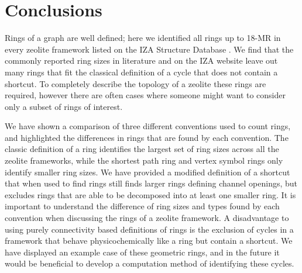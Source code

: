 \documentclass[preprint,numrefs,noinfo,sort&compress]{elsarticle}
\providecommand{\DIFaddbegin}{} %
\providecommand{\DIFaddend}{} %
\providecommand{\DIFdelbegin}{} %
\providecommand{\DIFdelend}{} %
\newcommand{\DIFscaledelfig}{0.5}
\newlength{\DIFdelgraphicswidth} %
\newlength{\DIFdelgraphicsheight} %
\newcommand{\DIFaddincludegraphics}[2][]{{\color{blue}\fbox{\DIFOincludegraphics[#1]{#2}}}} %
\newcommand{\DIFdelincludegraphics}[2][]{%
\sbox{\DIFdelgraphicsbox}{\DIFOincludegraphics[#1]{#2}}%
\settoboxwidth{\DIFdelgraphicswidth}{\DIFdelgraphicsbox} %
\settoboxtotalheight{\DIFdelgraphicsheight}{\DIFdelgraphicsbox} %
\scalebox{\DIFscaledelfig}{%
\parbox[b]{\DIFdelgraphicswidth}{\usebox{\DIFdelgraphicsbox}\\[-\baselineskip] \rule{\DIFdelgraphicswidth}{0em}}\llap{\resizebox{\DIFdelgraphicswidth}{\DIFdelgraphicsheight}{%
\setlength{\unitlength}{\DIFdelgraphicswidth}%
\begin{picture}(1,1)%
\thicklines\linethickness{2pt} %
{\color[rgb]{1,0,0}\put(0,0){\framebox(1,1){}}}%
{\color[rgb]{1,0,0}\put(0,0){\line( 1,1){1}}}%
{\color[rgb]{1,0,0}\put(0,1){\line(1,-1){1}}}%
\end{picture}%
}\hspace*{3pt}}} %
} %
\DeclareRobustCommand{\DIFaddbegin}{\DIFOaddbegin \let\includegraphics\DIFaddincludegraphics} %
\DeclareRobustCommand{\DIFaddend}{\DIFOaddend \let\includegraphics\DIFOincludegraphics} %
\DeclareRobustCommand{\DIFdelbegin}{\DIFOdelbegin \let\includegraphics\DIFdelincludegraphics} %
\DeclareRobustCommand{\DIFdelend}{\DIFOaddend \let\includegraphics\DIFOincludegraphics} %
\begin{document}
\begin{table}
\end{table}
\section{Conclusions}
\DIFdelbegin %
\DIFdelend \DIFaddbegin \label{sec:org9840720}
\DIFaddend Rings of a graph are well defined; here we identified all rings up to 18-MR in every zeolite framework listed on the IZA Structure Database \cite{baerlocher-database-nodate}. We find that the commonly reported ring sizes in literature and on the IZA website leave out many rings that fit the classical definition of a cycle that does not contain a shortcut. To completely describe the topology of a zeolite these rings are required, however there are often cases where someone might want to consider only a subset of rings of interest. 

We have shown a comparison of three different conventions used to count rings, and highlighted the differences in rings that are found by each convention. The classic definition of a ring identifies the largest set of ring sizes across all the zeolite frameworks, while the shortest path ring and vertex symbol rings only identify smaller ring sizes. We have provided a modified definition of a shortcut that when used to find rings still finds larger rings defining channel openings, but excludes rings that are able to be decomposed into at least one smaller ring. It is important to understand the difference of ring sizes and types found by each convention when discussing the rings of a zeolite framework. A disadvantage to using purely connectivity based definitions of rings is the exclusion of cycles in a framework that behave physicochemically like a ring but contain a shortcut. We have displayed an example case of these geometric rings, and in the future it would be beneficial to develop a computation method of identifying these cycles. 
\end{document}
